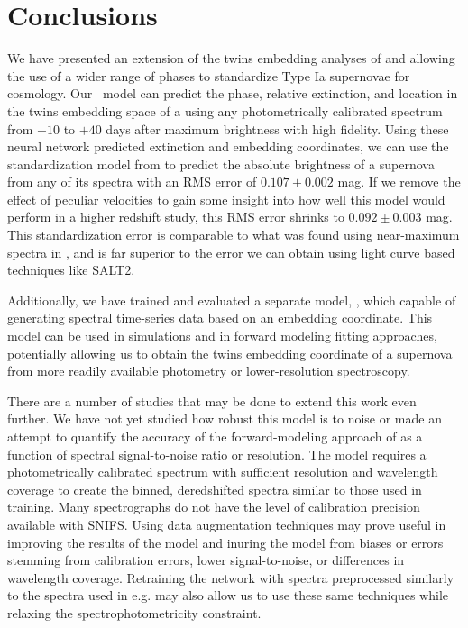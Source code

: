 \section{Conclusions} \label{sec:nn_twins_conclusions}
We have presented an extension of the twins embedding analyses of  and  allowing the use of a wider range of phases to standardize Type Ia supernovae for cosmology. Our \stoe~model can predict the phase, relative extinction, and location in the twins embedding space of a \sn using any photometrically calibrated spectrum from $-10$ to $+40$ days after maximum brightness with high fidelity. Using these neural network predicted extinction and embedding coordinates, we can use the standardization model from  to predict the absolute brightness of a supernova from any of its spectra with an RMS error of $0.107 \pm 0.002$ mag. If we remove the effect of peculiar velocities to gain some insight into how well this model would perform in a higher redshift study, this RMS error shrinks to $0.092 \pm 0.003$ mag. This standardization error is comparable to what was found using near-maximum spectra in , and is far superior to the error we can obtain using light curve based techniques like SALT2.

Additionally, we have trained and evaluated a separate model, \etos, which capable of generating spectral time-series data based on an embedding coordinate. This model can be used in simulations and in forward modeling fitting approaches, potentially allowing us to obtain the twins embedding coordinate of a supernova from more readily available photometry or lower-resolution spectroscopy.

There are a number of studies that may be done to extend this work even further. We have not yet studied how robust this model is to noise or made an attempt to quantify the accuracy of the forward-modeling approach of \etos{} as a function of spectral signal-to-noise ratio or resolution. The \stoe{} model requires a photometrically calibrated spectrum with sufficient resolution and wavelength coverage to create the binned, deredshifted spectra similar to those used in training. Many spectrographs do not have the level of calibration precision available with SNIFS. Using data augmentation techniques may prove useful in improving the results of the model \citep{boone_avocado_2019} and inuring the model from biases or errors stemming from calibration errors, lower signal-to-noise, or differences in wavelength coverage. Retraining the network with spectra preprocessed similarly to the spectra used in e.g. \citet{stahl_deepsip_2020} may also allow us to use these same techniques while relaxing the spectrophotometricity constraint.

